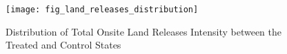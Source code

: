 \begin{figure}[H]
    \centering
    \texttt{[image: fig\_land\_releases\_distribution]}
    \caption{Distribution of Total Onsite Land Releases Intensity between the Treated and Control States}
    \label{fig:land-releases-distribution}
\end{figure}